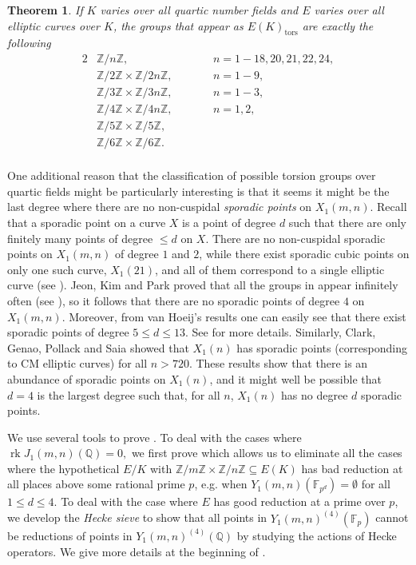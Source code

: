 \documentclass[11pt,reqno]{amsart}
\DeclareMathOperator{\rk}{rk}
\newtheorem{theorem}{Theorem}[section]
\theoremstyle{definition}
\numberwithin{equation}{section}
\newcommand{\Q}{\mathbb{Q}}
\newcommand{\F}{\mathbb{F}}
\newcommand{\tor}{\mathrm{tors}}
\def\torz#1{\mathbb Z /#1 \mathbb Z}
\def\tg#1#2{\mathbb Z/#1\mathbb Z \times \mathbb Z /#2 \mathbb Z}
\begin{document}
\begin{theorem}\label{main_theorem}
 If $K$ varies over all quartic number fields and $E$ varies over
all elliptic curves over $K$, the groups that appear as
$E(K)_{\tor}$ are exactly the following
\begin{alignat*}{2}
& \torz{n},  && n=1-18, 20,21,22,24, \\
& \tg{2}{2n}, \quad \quad && n=1-9, \\
& \tg{3}{3n}, \quad && n=1-3, \\
& \tg{4}{4n}, \quad && n=1,2, \\
& \tg{5}{5}, \quad && \\
& \tg{6}{6}. \quad && \\
\end{alignat*}
\end{theorem}

One additional reason that the classification of possible torsion groups over quartic fields might be particularly interesting is that it seems it might be the last degree where there are no non-cuspidal \textit{sporadic points} on $X_1(m,n)$. Recall that a sporadic point on a curve $X$ is a point of degree $d$ such that there are only finitely many points of degree $\leq d$ on $X$. There are no non-cuspidal sporadic points on $X_1(m,n)$ of degree $1$ and $2$, while there exist sporadic cubic points on only one such curve, $X_1(21)$, and all of them correspond to a single elliptic curve (see \cite{najman16}). Jeon, Kim and Park \cite{JeonKimPark06} proved that all the groups in  appear infinitely often (see ), so it follows that there are no sporadic points of degree $4$ on $X_1(m,n)$. Moreover, from van Hoeij's results \cite{vanHoeij} one can easily see that there exist sporadic points of degree $5\leq d\leq 13$. See  for more details. Similarly, Clark, Genao, Pollack and Saia \cite{CGPS22} showed that $X_1(n)$ has sporadic points (corresponding to CM elliptic curves) for all $n>720$. These results show that there is an abundance of sporadic points on $X_1(n)$, and it might well be possible that $d=4$ is the largest degree such that, for all $n$, $X_1(n)$ has no degree $d$ sporadic points.

We use several tools to prove . To deal with the cases where $\rk J_1(m,n)(\Q)=0,$ we first prove  which allows us to eliminate all the cases where the hypothetical $E/K$ with $\tg{m}{n}\subseteq E(K)$ has bad reduction at all places above some rational prime $p$, e.g. when $Y_1(m,n)(\F_{p^d})= \emptyset$ for all $1\leq d\leq 4.$ To deal with the case where $E$ has good reduction at a prime over $p$, we develop the \textit{Hecke sieve} to show that all points in $Y_1(m,n)^{(4)}(\F_{p})$ cannot be reductions of points in $Y_1(m,n)^{(4)}(\Q)$ by studying the actions of Hecke operators. We give more details at the beginning of . 
\end{document}
